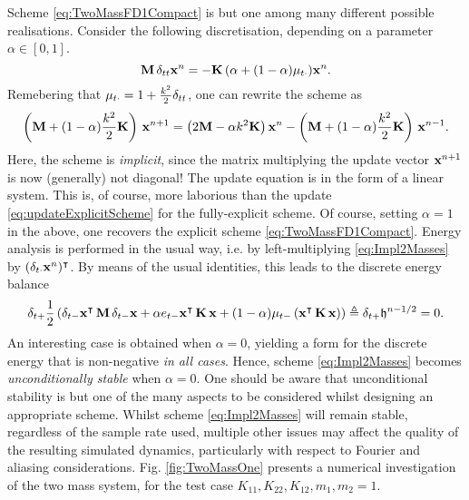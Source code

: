 Scheme \eqref{eq:TwoMassFD1Compact}  is but one among many different possible realisations. Consider the following discretisation, depending on a parameter $\alpha \in [0,1]$.
\begin{equation}\label{eq:Impl2Masses}
{\bf M}\, \delta_{tt} {\bf x}^n = - {\bf K}\, (\alpha + (1-\alpha)\mu_{t\cdot}) {\bf x}^n.
\end{equation}
Remebering that $\mu_{t\cdot} = 1 + \frac{k^2}{2}\delta_{tt}$, one can rewrite the scheme as 
\begin{equation}
\left({\bf M} + (1-\alpha)\frac{k^2}{2}{\bf K} \right) \, {\bf x}^{n+1} = \left(2 {\bf M} - \alpha k^2 {\bf K} \right){\bf x}^n - \left({\bf M} + (1-\alpha)\frac{k^2}{2}{\bf K} \right) \, {\bf x}^{n-1}.
\end{equation}
Here, the scheme is \emph{implicit}, since the matrix multiplying the update vector ${\bf x}^{n+1}$ is now (generally) not diagonal! The update equation is in the form of a linear system. This is, of course, more laborious than the update \eqref{eq:updateExplicitScheme} for the fully-explicit scheme. Of course, setting $\alpha = 1$ in the above, one recovers the explicit scheme \eqref{eq:TwoMassFD1Compact}.
Energy analysis is performed in the usual way, i.e. by left-multiplying \eqref{eq:Impl2Masses} by $(\delta_{t\cdot} {\bf x}^n)^\intercal$. By means of the usual identities, this leads to the discrete energy balance
\begin{equation}
 \delta_{t+} \frac{1}{2}\left( \delta_{t-} {\bf x}^{\intercal}\,{\bf M}\, \delta_{t-} {\bf x} + \alpha e_{t-} {\bf x}^{\intercal}\,{\bf K}\,  {\bf x} + (1-\alpha) \mu_{t-} \left({\bf x}^{\intercal}\,{\bf K}\,  {\bf x}\right) \right) \triangleq  \delta_{t+} {\mathfrak h}^{n-1/2}  = 0.
\end{equation}
An interesting case is obtained when $\alpha =0$, yielding a form for the discrete energy that is non-negative \emph{in all cases}.
Hence, scheme \eqref{eq:Impl2Masses} becomes \emph{unconditionally stable} when $\alpha = 0$. One should be aware that unconditional stability is but one of the many aspects to be considered whilst designing an appropriate scheme. Whilst scheme \eqref{eq:Impl2Masses} will remain stable, regardless of the sample rate used, multiple other issues may affect the quality of the resulting simulated dynamics, particularly with respect to Fourier and aliasing considerations. Fig. \ref{fig:TwoMassOne} presents a numerical investigation of the two mass system, for the test case $K_{11},K_{22},K_{12},m_1,m_2=1$. 



